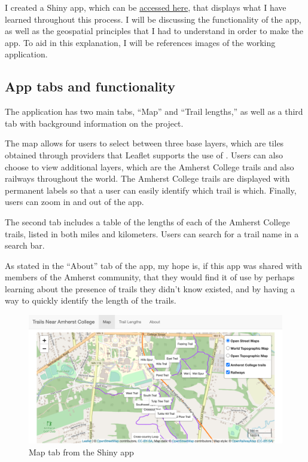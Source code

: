 \documentclass[12pt]{article}
\begin{document}
I created a Shiny app, which can be
\href{https://nfrontero20.shinyapps.io/leaflet/}{accessed here}, that
displays what I have learned throughout this process. I will be
discussing the functionality of the app, as well as the geospatial
principles that I had to understand in order to make the app. To aid in
this explanation, I will be references images of the working
application.

\hypertarget{app-tabs-and-functionality}{%
\subsection{App tabs and
functionality}\label{app-tabs-and-functionality}}

The application has two main tabs, ``Map'' and ``Trail lengths,'' as
well as a third tab with background information on the project.

The map allows for users to select between three base layers, which are
tiles obtained through providers that Leaflet supports the use of
\citep{rstudioLeaflet}. Users can also choose to view additional layers,
which are the Amherst College trails and also railways throughout the
world. The Amherst College trails are displayed with permanent labels so
that a user can easily identify which trail is which. Finally, users can
zoom in and out of the app.

The second tab includes a table of the lengths of each of the Amherst
College trails, listed in both miles and kilometers. Users can search
for a trail name in a search bar.

As stated in the ``About'' tab of the app, my hope is, if this app was
shared with members of the Amherst community, that they would find it of
use by perhaps learning about the presence of trails they didn't know
existed, and by having a way to quickly identify the length of the
trails.

\begin{figure}

{\centering \includegraphics[width=0.9\linewidth]{images/screenshot-app-map} 

}

\caption{Map tab from the Shiny app}\label{fig:unnamed-chunk-4}
\end{figure}
\end{document}
